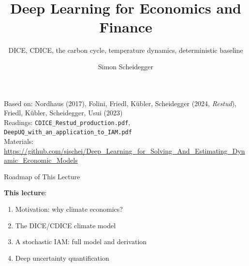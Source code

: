 \documentclass[aspectratio=169,11pt]{beamer}
\title[Deep Learning for Dynamic Economic Models]
{Deep Learning for Economics and Finance}
\subtitle{DICE, CDICE, the carbon cycle, temperature dynamics, deterministic baseline}
\author{Simon Scheidegger}
\institute[HEC Lausanne]{HEC, University of Lausanne}
\date{}
\begin{document}
\newcommand{\exercisepause}{%
  \tikz[baseline=(X.base)]{\node[fill=darkgreen!80!black, text=white,
  rounded corners=2pt, inner sep=3pt, font=\scriptsize\bfseries](X){PAUSE --- 5 min};}}



{
\begin{frame}
\titlepage
\vspace{-0.4cm}
\begin{center}
{\footnotesize Based on: Nordhaus (2017), Folini, Friedl, K\"ubler, Scheidegger (2024, \textit{Restud}),}\\[1pt]
{\footnotesize Friedl, K\"ubler, Scheidegger, Usui (2023)}\\[4pt]
{\footnotesize Readings: \texttt{CDICE\_Restud\_production.pdf}, \texttt{DeepUQ\_with\_an\_application\_to\_IAM.pdf}}\\[4pt]
{\footnotesize Materials: \url{https://github.com/sischei/Deep_Learning_for_Solving_And_Estimating_Dynamic_Economic_Models}}
\end{center}
\end{frame}
}

\begin{frame}{Roadmap of This Lecture}
\begin{center}
\end{center}

\vspace{0.3cm}
\textbf{This lecture}:
\begin{enumerate}
    \item Motivation: why climate economics?
    \item The DICE/CDICE climate model
    \item A stochastic IAM: full model and derivation
    \item Deep uncertainty quantification
\end{enumerate}
\end{frame}
\end{document}
